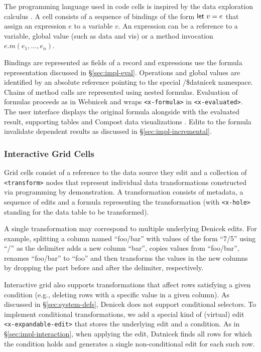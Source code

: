 \documentclass[sigconf,anonymous,screen]{acmart}
\newcommand{\ident}[1]{{\sffamily #1}}
\begin{document}
The programming language used in code cells is inspired by the data exploration calculus \cite{petricek-2020-live}.
A cell consists of a sequence of bindings of the form $\textnormal{\ident{let}}~v=e$ that assign
an expression $e$ to a variable $v$. An expression can be a reference to a variable,
global value (such as \ident{data} and \ident{vis}) or a method invocation $e.m(e_1, \ldots, e_n)$.

Bindings are represented as fields of a record and expressions use the formula representation
discussed in \S\ref{sec:impl-eval}. Operations and global values are identified by an absolute
reference pointing to the special \ident{/\$datnicek} namespace. Chains of method calls are
represented using nested formulas. Evaluation of formulas proceeds as in Webnicek
and wraps {\small\Verb_<x-formula>_} in {\small\Verb_<x-evaluated>_}.
The user interface displays the original formula alongside with the evaluated result, supporting
tables and Compost data visualizations \cite{petricek-2021-compost}. Edits to the formula
invalidate dependent results as discussed in \S\ref{sec:impl-incremental}.

\subsubsection*{Interactive Grid Cells}
Grid cells consist of a reference to the data source they edit and a collection of
{\small\Verb_<transform>_} nodes that represent individual data transformations constructed via
programming by demonstration. A transformation consists of metadata,
a sequence of edits and a formula representing the transformation (with {\small\Verb_<x-hole>_}
standing for the data table to be transformed).

A single transformation may correspond to multiple underlying Denicek edits. For example, splitting a
column named ``foo/bar'' with values of the form ``7/5'' using ``/'' as the delimiter adds a new column ``bar'', copies values from
``foo/bar'', renames ``foo/bar'' to ``foo'' and then transforms the values in the new columns
by dropping the part before and after the delimiter, respectively.

Interactive grid also supports transformations that affect rows satisfying a given
condition (e.g., deleting rows with a specific value in a given column). As discussed
in \S\ref{sec:system-defs}, Denicek does not support conditional selectors.
To implement conditional transformations, we add a special kind of (virtual) edit
{\small\Verb_<x-expandable-edit>_} that stores the underlying edit and a condition.
As in \S\ref{sec:impl-interaction}, when applying the edit, Datnicek finds all rows for which the
condition holds and generates a single non-conditional edit for each such row.
\end{document}
